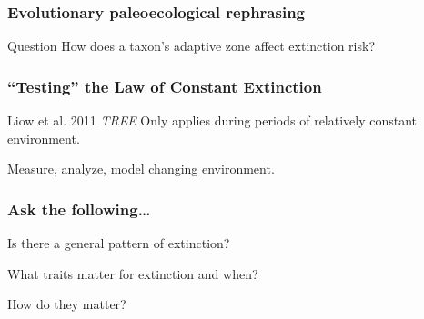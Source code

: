 \documentclass{beamer}
\begin{document}
\begin{frame}
  \frametitle{Evolutionary paleoecological rephrasing}

  \begin{block}{Question}
    How does a taxon's adaptive zone affect extinction risk?
  \end{block}
\end{frame}

\begin{frame}
  \frametitle{``Testing'' the Law of Constant Extinction}

  \begin{block}{Liow et al. 2011 \textit{TREE}}
    Only applies during periods of relatively \alert{constant} environment.
  \end{block}

  \vspace{1cm}

  \begin{center}
    Measure, analyze, model changing environment.
  \end{center}
\end{frame}


\begin{frame}
  \frametitle{Ask the following\dots}

  \begin{center}
    Is there a \alert{general pattern} of extinction?
    
    \vspace{0.75cm}

    \alert{What} traits matter for extinction and \alert{when}?

    \vspace{0.75cm}

    \alert{How} do they matter?
  \end{center}
\end{frame}

\end{document}
